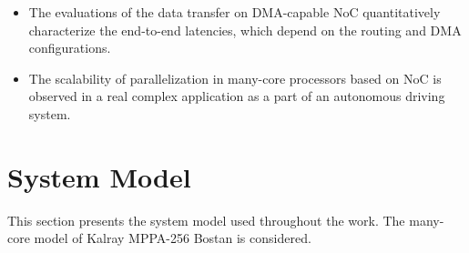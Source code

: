 \documentclass[conference,compsoc]{IEEEtran}
\newcommand{\comment}[1]{}
\begin{document}
\vspace{-1mm}
\begin{itemize}
\setlength{\leftskip}{-5mm}
\item The evaluations of the data transfer on DMA-capable NoC quantitatively characterize the end-to-end latencies, which depend on the routing and DMA configurations.
\item The scalability of parallelization in many-core processors based on NoC is observed in a real complex application as a part of an autonomous driving system.
\end{itemize}
\vspace{-2mm}

\comment{1-8, 1-9}



\vspace{-2mm}
\section{System Model}
\label{sec:system_model}
\vspace{-3mm}
This section presents the system model used throughout the work.
The many-core model of Kalray MPPA-256 Bostan is considered.
\end{document}
